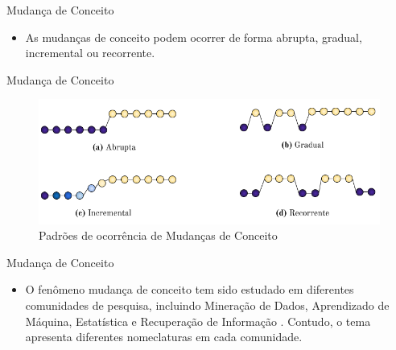 \documentclass[10pt]{beamer}
\begin{document}
\begin{frame}{Mudança de Conceito}
    \begin{itemize}
        \item<1 -> As mudanças de conceito podem ocorrer de forma abrupta, gradual, incremental ou recorrente.
    \end{itemize}
\end{frame}

\begin{frame}{Mudança de Conceito}
\begin{figure}[H]
    \begin{center}
        \includegraphics[scale=0.5]{imagens/concept_drift_patterns.png}
        \caption{Padrões de ocorrência de Mudanças de Conceito}
        \label{fig:concept_drift_patterns}
    \end{center}
    \end{figure}
\end{frame}

\begin{frame}{Mudança de Conceito}
    \begin{itemize}
        \item<1 -> O fenômeno mudança de conceito tem sido estudado em diferentes comunidades de pesquisa, incluindo Mineração de Dados, Aprendizado de Máquina, Estatística e Recuperação de Informação \cite{Zliobaite:2010}. Contudo, o tema apresenta diferentes nomeclaturas em cada comunidade.
    \end{itemize}
\end{frame}
\end{document}
